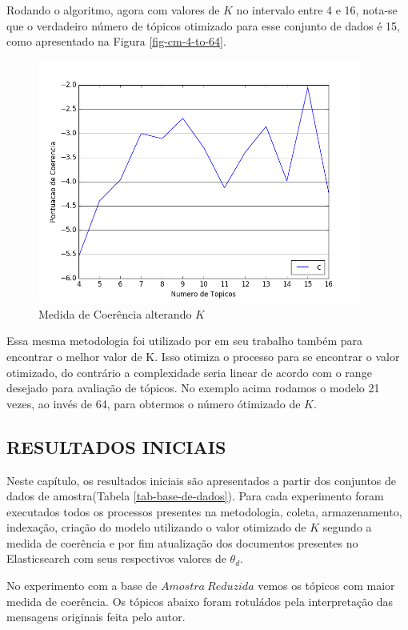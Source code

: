 \documentclass[12pt,a4paper]{article}
\begin{document}
Rodando o algoritmo, agora com valores de $K$ no intervalo entre 4 e 16, nota-se que o verdadeiro número de tópicos otimizado para esse 
 conjunto de dados é 15, como apresentado na Figura \ref{fig-cm-4-to-64}.

\begin{figure}[H]
	\centering
    \includegraphics[height=8cm]{images/figure_6.png}
    \caption{Medida de Coerência alterando $K$}
    \label{fig-cm-4-to-16}
\end{figure}

Essa mesma metodologia foi utilizado por  em seu trabalho também para encontrar o melhor valor de K. Isso otimiza
 o processo para se encontrar o valor otimizado, do contrário a complexidade seria linear de acordo com o range desejado para avaliação de
 tópicos. No exemplo acima rodamos o modelo 21 vezes, ao invés de 64, para obtermos o número ótimizado de $K$.

\subsection{RESULTADOS INICIAIS}

Neste capítulo, os resultados iniciais são apresentados a partir dos conjuntos de dados de amostra(Tabela \ref{tab-base-de-dados}).
 Para cada experimento foram executados todos os processos presentes na metodologia, coleta, armazenamento, indexação, criação do modelo utilizando o valor
 otimizado de $K$ segundo a medida de coerência e por fim atualização dos documentos presentes no Elasticsearch com seus respectivos valores de $\theta_d$.


No experimento com a base de $Amostra\ Reduzida$ vemos os tópicos com maior medida de coerência.
 Os tópicos abaixo foram rotuládos pela interpretação das mensagens originais feita pelo autor.
\end{document}
